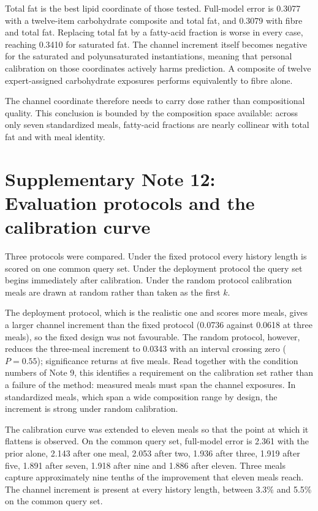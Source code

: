 \documentclass[10pt]{article}
\begin{document}
Total fat is the best lipid coordinate of those tested. Full-model error is 0.3077 with a
twelve-item carbohydrate composite and total fat, and 0.3079 with fibre and total fat. Replacing
total fat by a fatty-acid fraction is worse in every case, reaching 0.3410 for saturated fat. The
channel increment itself becomes negative for the saturated and polyunsaturated instantiations,
meaning that personal calibration on those coordinates actively harms prediction. A composite of
twelve expert-assigned carbohydrate exposures performs equivalently to fibre alone.

The channel coordinate therefore needs to carry dose rather than compositional quality. This
conclusion is bounded by the composition space available: across only seven standardized meals,
fatty-acid fractions are nearly collinear with total fat and with meal identity.




\clearpage

\section*{Supplementary Note 12: Evaluation protocols and the calibration curve}

Three protocols were compared. Under the fixed protocol every history length is scored on one
common query set. Under the deployment protocol the query set begins immediately after
calibration. Under the random protocol calibration meals are drawn at random rather than taken as
the first $k$.

The deployment protocol, which is the realistic one and scores more meals, gives a larger channel
increment than the fixed protocol (0.0736 against 0.0618 at three meals), so the fixed design was
not favourable. The random protocol, however, reduces the three-meal increment to 0.0343 with an
interval crossing zero ($P=0.55$); significance returns at five meals. Read together with the
condition numbers of Note 9, this identifies a requirement on the calibration set rather than a
failure of the method: measured meals must span the channel exposures. In standardized meals,
which span a wide composition range by design, the increment is strong under random calibration.

The calibration curve was extended to eleven meals so that the point at which it flattens is
observed. On the common query set, full-model error is 2.361 with the prior alone, 2.143 after one
meal, 2.053 after two, 1.936 after three, 1.919 after five, 1.891 after seven, 1.918 after nine
and 1.886 after eleven. Three meals capture approximately nine tenths of the improvement that
eleven meals reach. The channel increment is present at every history length, between 3.3\% and
5.5\% on the common query set.
\end{document}
